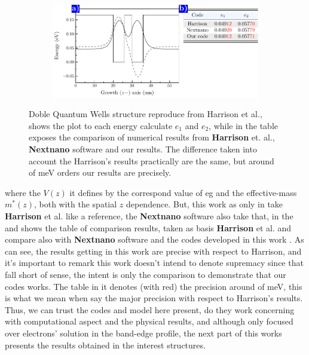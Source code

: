 \begin{figure}[H]
	\centering
	\begin{subfigure}{\textwidth}
	\includegraphics[width=\textwidth]{../figures/chapter-2/numerical-calculations/out/harrison-wells}
	\label{subfig:chapter-2-sec-numerical-comparison-harrison-plot-a}
	\label{subfig:chapter-2-sec-numerical-comparison-harrison-table-b}
	\end{subfigure}
	\caption{Doble Quantum Wells structure reproduce from  Harrison et al.\cite{harrison2016chap3},  shows the plot to each energy calculate $e_{1}$ and $e_{2}$, while in  the table exposes the comparison of  numerical results from \textbf{Harrison} et. al., \textbf{Nextnano} software \cite{Nextnanoharrison} and our results. The difference taken into account the Harrison's results practically are the same, but around of meV orders our results are precisely.  }
	\label{fig:chapter-2-sec-numerical-calculations-harrison-wells}
\end{figure}
where the $V(z)$ it defines by the correspond value of \gls{eg} and the effective-mass $m^{*}(z)$, both with the spatial $z$ dependence. But, this work as only in take \textbf{Harrison} et al.\cite{harrison2016quantum} like a reference, the \textbf{Nextnano} software\cite{birner2007Nextnano,Nextnanoharrison} also take that, in the  and  shows the table of comparison results, taken as basis \textbf{Harrison} et al. and compare also with  \textbf{Nextnano} software and the codes developed in this work \cite{cqws-codes}. As can see, the results getting in this work are precise with respect to Harrison, and it's important to remark this work doesn't intend to denote supremacy since that fall short of sense, the intent is only the comparison to demonstrate that our codes works. The table in  it denotes (with red) the precision around of meV, this is what we mean when say the major precision with respect to Harrison's results. 
Thus, we can trust the codes and model here present, do they work concerning with computational aspect and the physical results, and although only focused over electrons' solution in the band-edge profile, the next part of this works presents the results obtained in the interest structures. 
